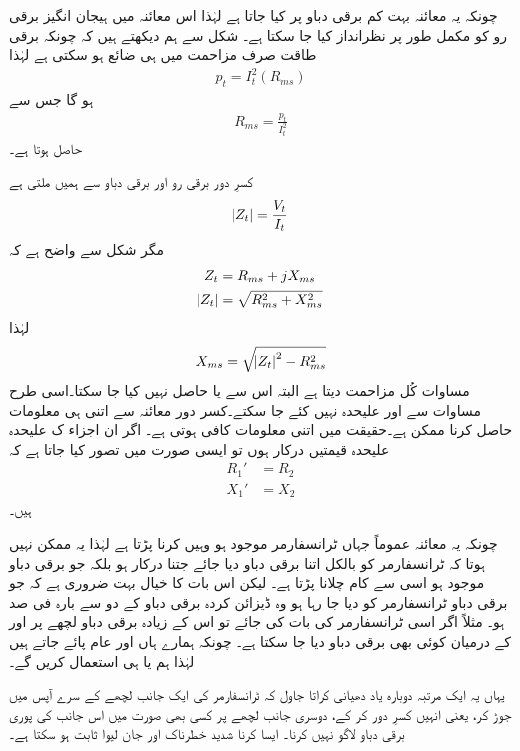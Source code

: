  چونکہ یہ معائنہ بہت کم برقی دباو پر کیا جاتا ہے لہٰذا اس معائنہ میں ہیجان انگیز برقی رو کو مکمل طور پر نظرانداز کیا جا سکتا ہے۔ شکل سے ہم دیکھتے ہیں کہ چونکہ برقی طاقت صرف مزاحمت میں ہی ضائع ہو سکتی ہے لہٰذا
\begin{align*}
p_t=I_t^2 \left(R_{ms}\right)
\end{align*}
ہو گا جس سے
\begin{align}\label{مساوات_ٹرانسفارمر_کسر_دور_مزاحمت_حاصل}
R_{ms}=\frac{p_t}{I_t^2}
\end{align}
حاصل ہوتا ہے۔

کسرِ دور برقی رو اور برقی دباو سے ہمیں ملتی ہے
\begin{align*}
\abs{Z_t}=\frac{V_t}{I_t}
\end{align*}
مگر شکل سے واضح ہے کہ
\begin{align*}
Z_t&=R_{ms}+j X_{ms}\\
\abs{Z_t}&=\sqrt{R_{ms}^2+X_{ms}^2}
\end{align*}
لہٰذا
\begin{align}\label{مساوات_ٹرانسفارمر_کسر_دور_امالہ_حاصل}
X_{ms}=\sqrt{\abs{Z_t}^2-R_{ms}^2}
\end{align}
مساوات  کُل مزاحمت دیتا ہے البتہ اس سے  یا  حاصل نہیں کیا جا سکتا۔اسی طرح مساوات  سے  اور  علیحدہ نہیں کئے جا سکتے۔کسر دور معائنہ سے اتنی ہی معلومات حاصل کرنا ممکن ہے۔حقیقت میں اتنی معلومات کافی ہوتی ہے۔ اگر ان اجزاء ک علیحدہ علیحدہ قیمتیں درکار ہوں تو ایسی صورت میں تصور کیا جاتا ہے کہ
\begin{align*}
R_1'&=R_2\\
X_1'&=X_2
\end{align*}
ہیں۔

 چونکہ یہ معائنہ عموماً جہاں ٹرانسفارمر موجود ہو وہیں کرنا پڑتا ہے لہٰذا یہ ممکن نہیں ہوتا کہ ٹرانسفارمر کو بالکل اتنا برقی دباو دیا جائے جتنا درکار ہو بلکہ جو برقی دباو موجود ہو اسی سے کام چلانا پڑتا ہے۔ لیکن اس بات کا خیال بہت ضروری ہے کہ جو برقی دباو ٹرانسفارمر کو دیا جا رہا ہو وہ ڈیزائن کردہ برقی دباو کے دو سے بارہ  فی صد ہو۔ مثلاً اگر اسی  ٹرانسفارمر کی بات کی جائے تو اس کے زیادہ برقی دباو لچھے پر  اور   کے درمیان کوئی بھی برقی دباو دیا جا سکتا ہے۔ چونکہ ہمارے ہاں   اور   عام پائے جاتے ہیں لہٰذا ہم   یا   ہی استعمال کریں گے۔

یہاں یہ ایک مرتبہ دوبارہ یاد دھیانی کراتا جاول کہ ٹرانسفارمر کی ایک جانب لچھے کے سرے آپس میں جوڑ کر، یعنی انہیں کسرِ دور کر کے، دوسری جانب لچھے پر کسی بھی صورت میں اس جانب کی پوری برقی دباو لاگو نہیں کرنا۔ ایسا کرنا  شدید  خطرناک اور جان لیوا ثابت ہو سکتا ہے۔

